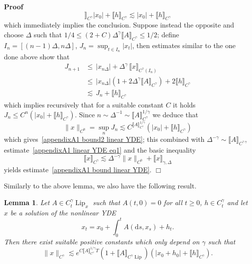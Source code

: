 \documentclass[10pt]{article}
\newcommand{\mathd}{\mathrm{d}}
\newcommand{\tmop}[1]{\ensuremath{\operatorname{#1}}}
\newenvironment{proof}{\noindent\textbf{Proof\ }}{\hspace*{\fill}$\Box$\medskip}
\newtheorem{lemma}{Lemma}
\begin{document}
\begin{proof}
\[     \rrbracket_{C^{\gamma}} | x_0 | + \llbracket h \rrbracket_{C^{\gamma}}
     \lesssim | x_0 | + \llbracket h \rrbracket_{C^{\gamma}} \]
  which immediately implies the conclusion. Suppose instead the opposite and
  choose $\Delta$ such that $1 / 4 \leqslant (2 + C) \Delta^{\gamma}
  \llbracket A \rrbracket_{C^{\gamma}} \leqslant 1 / 2$; define $I_n = [(n -
  1) \Delta, n \Delta]$, $J_n = \sup_{t \in I_n} | x_t |$, then estimates
  similar to the one done above show that
%  
  \begin{align*}
    J_{n + 1} & \leqslant \, | x_{n \Delta} | + \Delta^{\gamma} \, \llbracket
    x \rrbracket_{C^{\gamma} (I_n)}\\
    & \leqslant \, | x_{n \Delta} | (1 + 2 \Delta^{\gamma} \llbracket A
    \rrbracket_{C^{\gamma}}) + 2 \llbracket h \rrbracket_{C^{\gamma}}\\
    & \lesssim \, J_n + \llbracket h \rrbracket_{C^{\gamma}}
  \end{align*}
%  
  which implies recursively that for a suitable constant $C$ it holds $J_n
  \leqslant C^n (| x_0 | + \llbracket h \rrbracket_{C^{\gamma}})$. Since $n
  \sim \Delta^{- 1} \sim \llbracket A \rrbracket_{C^{\gamma}}^{1 / \gamma}$ we
  deduce that
  \[ \| x \|_{C^0} = \sup_n J_n \lesssim C^{\llbracket A \rrbracket^{1 /
     \gamma}_{C^{\gamma}}} (| x_0 | + \llbracket h \rrbracket_{C^{\gamma}}) \]
  which gives~{\eqref{appendixA1 bound2 linear YDE}}; this combined with
  $\Delta^{- \gamma} \sim \llbracket A \rrbracket_{C^{\gamma}}$,
  estimate~{\eqref{appendixA1 linear YDE eq1}} and the basic inequality
  \[ \llbracket x \rrbracket_{C^{\gamma}} \lesssim \Delta^{- \gamma} \| x
     \|_{C^0} + \llbracket x \rrbracket_{\gamma, \Delta} \]
  yields estimate~{\eqref{appendixA1 bound linear YDE}}.
\end{proof}

Similarly to the above lemma, we also have the following result.

\begin{lemma}
  \label{appendixA1 lemma bound nonlinear YDE}Let $A \in C^{\gamma}_t
  \tmop{Lip}_x$ such that $A (t, 0) = 0$ for all $t \geqslant 0$, $h \in
  C^{\gamma}_t$ and let $x$ be a solution of the nonlinear YDE
  \[ x_t = x_0 + \int_0^t A (\mathd s, x_s) + h_t . \]
  Then there exist suitable positive constants which only depend on $\gamma$
  such that
  \begin{equation}
    \| x \|_{C^{\gamma}} \lesssim e^{C \llbracket A \rrbracket_{C^{\gamma}}^{1
    / \gamma} T} (1 + \llbracket A \rrbracket_{C^{\gamma} \tmop{Lip}}) (| x_0
    + h_0 | + \llbracket h \rrbracket_{C^{\gamma}}) . \label{appendixA1 bound
    nonlinear YDE}
  \end{equation}
\end{lemma}
\end{document}
